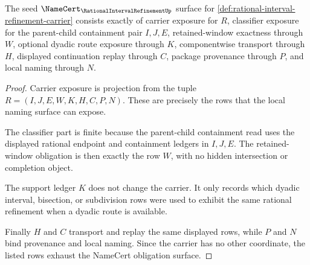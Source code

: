 \begin{theorem}
\label{thm:rational-interval-refinement-namecert-obligations}
The seed $\NameCert_{\RationalIntervalRefinementUp}$ surface for \autoref{def:rational-interval-refinement-carrier} consists exactly of carrier exposure for $R$, classifier exposure for the parent-child containment pair $I,J,E$, retained-window exactness through $W$, optional dyadic route exposure through $K$, componentwise transport through $H$, displayed continuation replay through $C$, package provenance through $P$, and local naming through $N$.
\end{theorem}
\begin{proof}
Carrier exposure is projection from the tuple $R=(I,J,E,W,K,H,C,P,N)$. These are precisely the rows that the local naming surface can expose.

The classifier part is finite because the parent-child containment read uses the displayed rational endpoint and containment ledgers in $I,J,E$. The retained-window obligation is then exactly the row $W$, with no hidden intersection or completion object.

The support ledger $K$ does not change the carrier. It only records which dyadic interval, bisection, or subdivision rows were used to exhibit the same rational refinement when a dyadic route is available.

Finally $H$ and $C$ transport and replay the same displayed rows, while $P$ and $N$ bind provenance and local naming. Since the carrier has no other coordinate, the listed rows exhaust the NameCert obligation surface.
\end{proof}

